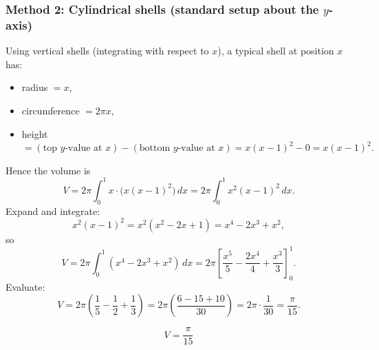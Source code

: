 \documentclass[12pt]{article}
\begin{document}
\subsubsection*{Method 2: Cylindrical shells (standard setup about the \(y\)-axis)}

Using vertical shells (integrating with respect to \(x\)), a typical shell at position \(x\) has:
\begin{itemize}[leftmargin=*]
\item radius \(=x\),
\item circumference \(=2\pi x\),
\item height \(= (\text{top }y\text{-value at }x)-(\text{bottom }y\text{-value at }x)
= x(x-1)^2-0 = x(x-1)^2.\)
\end{itemize}
Hence the volume is
\[
V=2\pi\int_{0}^{1} x\cdot \big(x(x-1)^2\big)\,dx
=2\pi\int_{0}^{1} x^2(x-1)^2\,dx.
\]
Expand and integrate:
\[
x^2(x-1)^2=x^2(x^2-2x+1)=x^4-2x^3+x^2,
\]
so
\[
V=2\pi\int_{0}^{1}\left(x^4-2x^3+x^2\right)\,dx
=2\pi\left[\frac{x^5}{5}-\frac{2x^4}{4}+\frac{x^3}{3}\right]_{0}^{1}.
\]
Evaluate:
\[
V=2\pi\left(\frac15-\frac12+\frac13\right)
=2\pi\left(\frac{6-15+10}{30}\right)
=2\pi\cdot\frac{1}{30}
=\frac{\pi}{15}.
\]

\[
\boxed{V=\frac{\pi}{15}}
\]
\end{document}
